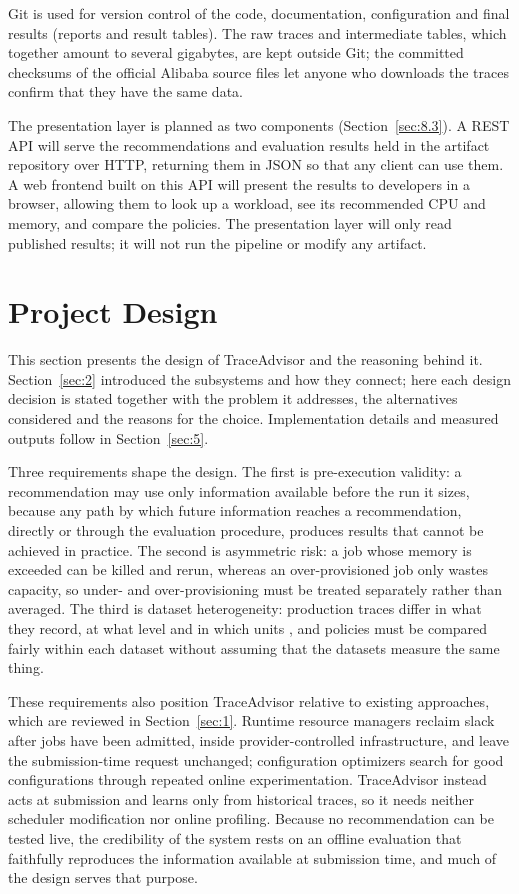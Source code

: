 \documentclass{IEEEtran}
\begin{document}
Git is used for version control of the code, documentation, configuration and final results (reports and result tables). The raw traces and intermediate tables, which together amount to several gigabytes, are kept outside Git; the committed checksums of the official Alibaba source files let anyone who downloads the traces confirm that they have the same data.

The presentation layer is planned as two components (Section~\ref{sec:8.3}). A REST API will serve the recommendations and evaluation results held in the artifact repository over HTTP, returning them in JSON so that any client can use them. A web frontend built on this API will present the results to developers in a browser, allowing them to look up a workload, see its recommended CPU and memory, and compare the policies. The presentation layer will only read published results; it will not run the pipeline or modify any artifact.

\section{Project Design}\label{sec:4}

This section presents the design of TraceAdvisor and the reasoning behind it. Section~\ref{sec:2} introduced the subsystems and how they connect; here each design decision is stated together with the problem it addresses, the alternatives considered and the reasons for the choice. Implementation details and measured outputs follow in Section~\ref{sec:5}.

Three requirements shape the design. The first is pre-execution validity: a recommendation may use only information available before the run it sizes, because any path by which future information reaches a recommendation, directly or through the evaluation procedure, produces results that cannot be achieved in practice. The second is asymmetric risk: a job whose memory is exceeded can be killed and rerun, whereas an over-provisioned job only wastes capacity, so under- and over-provisioning must be treated separately rather than averaged. The third is dataset heterogeneity: production traces differ in what they record, at what level and in which units \cite{ref7,ref19}, and policies must be compared fairly within each dataset without assuming that the datasets measure the same thing.

These requirements also position TraceAdvisor relative to existing approaches, which are reviewed in Section~\ref{sec:1}. Runtime resource managers reclaim slack after jobs have been admitted, inside provider-controlled infrastructure, and leave the submission-time request unchanged; configuration optimizers search for good configurations through repeated online experimentation. TraceAdvisor instead acts at submission and learns only from historical traces, so it needs neither scheduler modification nor online profiling. Because no recommendation can be tested live, the credibility of the system rests on an offline evaluation that faithfully reproduces the information available at submission time, and much of the design serves that purpose.
\end{document}
